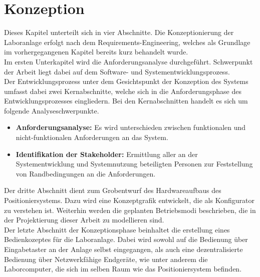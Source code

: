 \documentclass[../../Bachelorarbeit.tex]{subfiles}
\begin{document}
\section{Konzeption}
Dieses Kapitel unterteilt sich in vier Abschnitte. Die Konzeptionierung der Laboranlage erfolgt nach dem Requirements-Engineering, welches als Grundlage im vorhergegangenen Kapitel bereits kurz behandelt wurde.\\
Im ersten Unterkapitel wird die Anforderungsanalyse durchgeführt. Schwerpunkt der Arbeit liegt dabei auf dem Software- und Systementwicklungsprozess.\\
Der Entwicklungsprozess unter dem Gesichtspunkt der Konzeption des Systems umfasst dabei zwei Kernabschnitte, welche sich in die Anforderungsphase des Entwicklungsprozesses eingliedern. Bei den Kernabschnitten handelt es sich um folgende Analyseschwerpunkte.\\
\begin{itemize}
    \item \textbf{Anforderungsanalyse:} Es wird unterschieden zwischen funktionalen und nicht-funktionalen Anforderungen an das System.
    \item \textbf{Identifikation der Stakeholder:} Ermittlung aller an der Systementwicklung und Systemnutzung beteiligten Personen zur Feststellung von Randbedingungen an die Anforderungen.
\end{itemize}

Der dritte Abschnitt dient zum Grobentwurf des Hardwareaufbaus des Positioniersystems. Dazu wird eine Konzeptgrafik entwickelt, die als Konfigurator zu verstehen ist. Weiterhin werden die geplanten Betriebsmodi beschrieben, die in der Projektierung dieser Arbeit zu modellieren sind.\\
Der letzte Abschnitt der Konzeptionsphase beinhaltet die erstellung eines Bedienkozeptes für die Laboranlage. Dabei wird sowohl auf die Bedienung über Eingabetaster an der Anlage selbst eingegangen, als auch eine dezentralisierte Bedienung über Netzwerkfähige Endgeräte, wie unter anderem die Laborcomputer, die sich im selben Raum wie das Positioniersystem befinden.
\end{document}
